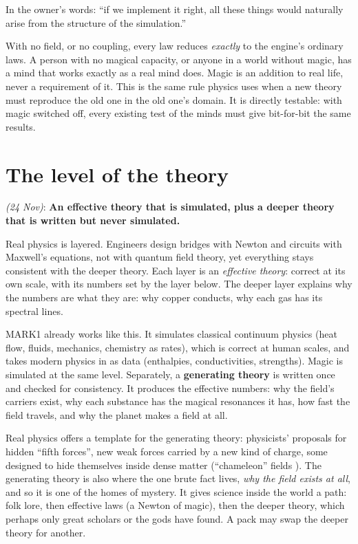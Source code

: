 \documentclass[11pt,a4paper]{article}
\newcommand{\decision}[3]{\par\smallskip\noindent{\color{dec}\textbf{Decision #1}} \textit{(#2)}: \textbf{#3}\par}
\begin{document}
\begin{description}[style=nextline,leftmargin=1.2em]
  \item[A7. Cases emerge; they are never coded.] In the owner's words: ``if we implement it right, all these things would naturally arise from the structure of the simulation.''
  \item[A8. The zero-magic limit.] With no field, or no coupling, every law reduces \emph{exactly} to the engine's ordinary laws. A person with no magical capacity, or anyone in a world without magic, has a mind that works exactly as a real mind does. Magic is an addition to real life, never a requirement of it. This is the same rule physics uses when a new theory must reproduce the old one in the old one's domain. It is directly testable: with magic switched off, every existing test of the minds must give bit-for-bit the same results.
\end{description}

\section{The level of the theory}\label{sec:level}

\decision{Q1.0}{24 Nov}{An effective theory that is simulated, plus a deeper theory that is written but never simulated.}

Real physics is layered. Engineers design bridges with Newton and circuits with Maxwell's equations, not with quantum field theory, yet everything stays consistent with the deeper theory. Each layer is an \emph{effective theory}: correct at its own scale, with its numbers set by the layer below. The deeper layer explains why the numbers are what they are: why copper conducts, why each gas has its spectral lines.

MARK1 already works like this. It simulates classical continuum physics (heat flow, fluids, mechanics, chemistry as rates), which is correct at human scales, and takes modern physics in as data (enthalpies, conductivities, strengths). Magic is simulated at the same level. Separately, a \textbf{generating theory} is written once and checked for consistency. It produces the effective numbers: why the field's carriers exist, why each substance has the magical resonances it has, how fast the field travels, and why the planet makes a field at all.

Real physics offers a template for the generating theory: physicists' proposals for hidden ``fifth forces'', new weak forces carried by a new kind of charge, some designed to hide themselves inside dense matter (``chameleon'' fields \cite{chameleon}). The generating theory is also where the one brute fact lives, \emph{why the field exists at all}, and so it is one of the homes of mystery. It gives science inside the world a path: folk lore, then effective laws (a Newton of magic), then the deeper theory, which perhaps only great scholars or the gods have found. A pack may swap the deeper theory for another.
\end{document}
